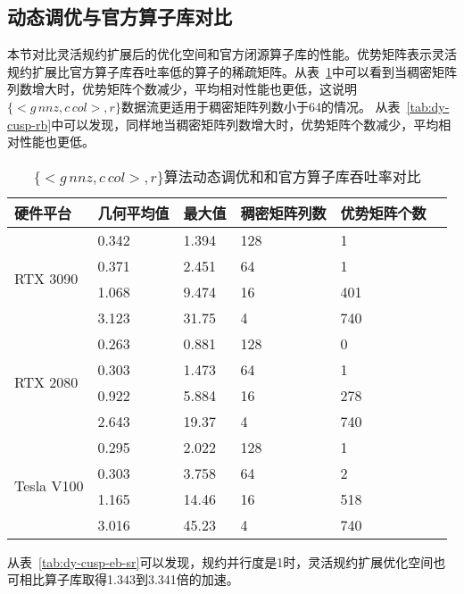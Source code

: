 \subsection{动态调优与官方算子库对比}\label{sec:overcu}
本节对比灵活规约扩展后的优化空间和官方闭源算子库的性能。优势矩阵表示灵活规约扩展比官方算子库吞吐率低的算子的稀疏矩阵。从表~\ref{tab:dy-cusp-eb}中可以看到当稠密矩阵列数增大时，优势矩阵个数减少，平均相对性能也更低，这说明$\{<g\,nnz , c\,col>,r\}$数据流更适用于稠密矩阵列数小于64的情况。
从表~\ref{tab:dy-cusp-rb}中可以发现，同样地当稠密矩阵列数增大时，优势矩阵个数减少，平均相对性能也更低。
\begin{table}
  \centering
  \caption{$\{<g\,nnz , c\,col>,r\}$算法动态调优和和官方算子库吞吐率对比}
  \begin{tabular}{llllll}
  \toprule
  硬件平台 & 几何平均值 & 最大值  & 稠密矩阵列数 & 优势矩阵个数 \\
  \midrule
  \multirow{4}{*}{RTX 3090}& 0.342 & 1.394  & 128 & 1\\
                           & 0.371 & 2.451  & 64 & 1\\
                           & 1.068 & 9.474  & 16 & 401\\
                           & 3.123 & 31.75  & 4 & 740\\
  \hline
  \multirow{4}{*}{RTX 2080}& 0.263 & 0.881  & 128 & 0\\
                          & 0.303 & 1.473   & 64 & 1\\
                          & 0.922 & 5.884  & 16 & 278\\
                          & 2.643 & 19.37  & 4 & 740\\
  \hline
  \multirow{4}{*}{Tesla V100}& 0.295 & 2.022  & 128 & 1\\
                          & 0.303 & 3.758  & 64 & 2\\
                          & 1.165 & 14.46  & 16 & 518\\
                          & 3.016 & 45.23  & 4 & 740\\
  \bottomrule
  \end{tabular}
  \label{tab:dy-cusp-eb}
\end{table}
从表~\ref{tab:dy-cusp-eb-sr}可以发现，规约并行度是1时，灵活规约扩展优化空间也可相比算子库取得1.343到3.341倍的加速。
